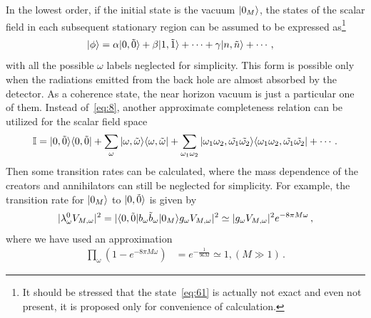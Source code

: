 \documentclass[12pt,a4paper]{article}
\begin{document}
In the lowest order, if the initial state is the vacuum $\arrowvert0_M\rangle$, the states of the scalar field in each subsequent stationary region can be assumed to be expressed as\footnote{It should be stressed that the state~\eqref{eq:61} is actually not exact and even not present, it is proposed only for convenience of calculation. }
\begin{equation}
\label{eq:61}
\begin{split}
\arrowvert\phi\rangle &=
\alpha\arrowvert0,\tilde{0}\rangle+\beta\arrowvert1,\tilde{1}\rangle+\cdots+\gamma\arrowvert
n,\tilde{n}\rangle+\cdots \,,
\end{split}
\end{equation}
with all the possible $\omega$ labels neglected for simplicity. This form is possible only when the radiations emitted from the back hole are almost absorbed by the detector. As a
coherence state, the near horizon vacuum is just a
particular one of them. Instead of~\eqref{eq:8}, another approximate completeness relation can be utilized for the scalar field space
\begin{equation}
\label{eq:62}
\begin{split}
\mathbb{I} =
\arrowvert0,\tilde{0}\rangle\langle0,\tilde{0}\arrowvert+\sum_{\omega}\arrowvert\omega,\tilde{\omega}\rangle\langle\omega,\tilde{\omega}\arrowvert+
\sum_{\omega_1\omega_2}\arrowvert\omega_1\omega_2,\tilde{\omega_1}\tilde{\omega_2}\rangle\langle\omega_1\omega_2,\tilde{\omega_1}\tilde{\omega_2}\arrowvert+\cdots \,.
\end{split}
\end{equation}
Then some transition rates can be calculated, where the mass dependence of the creators and annihilators can still be neglected for simplicity.
For example, the transition rate for $\arrowvert0_M\rangle$ to
$\arrowvert0,\tilde{0}\rangle$ is given by
\begin{equation}
\label{eq:63}
\begin{split}
|\lambda^{0}_{\omega}V_{M,\omega}|^2=|\langle0,\tilde{0}\arrowvert
b_{\omega}\tilde{b}_{\omega}\arrowvert0_M\rangle
g_{\omega}V_{M,\omega}|^2\simeq |g_{\omega}V_{M,\omega}|^2e^{-8\pi
M\omega} \,,
\end{split}
\end{equation}
where we have used an approximation
\begin{equation}
\label{eq:64}
\begin{split}
\prod_\omega(1-e^{-8\pi M\omega}) &= e^{-\frac{1}{96M}}\simeq 1,
(M\gg 1) \,.
\end{split}
\end{equation}
\end{document}

